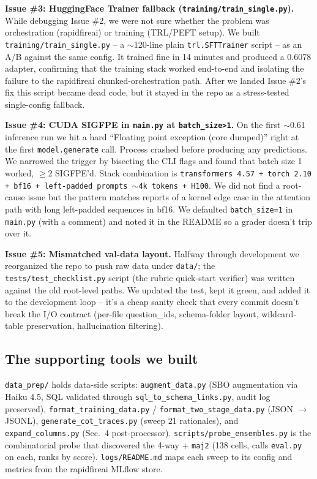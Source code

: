 \documentclass[10pt]{article}
\begin{document}
\textbf{Issue \#3: HuggingFace Trainer fallback (\texttt{training/train\_single.py}).}
While debugging Issue \#2, we were not sure whether the problem was orchestration
(rapidfireai) or training (TRL/PEFT setup). We built
\texttt{training/train\_single.py} -- a $\sim$120-line plain
\texttt{trl.SFTTrainer} script -- as an A/B against the same config. It
trained fine in 14 minutes and produced a 0.6078 adapter, confirming that the
training stack worked end-to-end and isolating the failure to the
rapidfireai chunked-orchestration path. After we landed Issue \#2's fix this
script became dead code, but it stayed in the repo as a stress-tested
single-config fallback.

\textbf{Issue \#4: CUDA SIGFPE in \texttt{main.py} at \texttt{batch\_size>1}.}
On the first $\sim$0.61 inference run we hit a hard ``Floating point exception
(core dumped)'' right at the first \texttt{model.generate} call. Process
crashed before producing any predictions. We narrowed the trigger by bisecting
the CLI flags and found that batch size 1 worked, $\geq$2 SIGFPE'd. Stack
combination is \texttt{transformers 4.57 + torch 2.10 + bf16 + left-padded
prompts $\sim$4k tokens + H100}. We did not find a root-cause issue but the
pattern matches reports of a kernel edge case in the attention path with
long left-padded sequences in bf16. We defaulted
\texttt{batch\_size=1} in \texttt{main.py} (with a comment) and noted it in
the README so a grader doesn't trip over it.

\textbf{Issue \#5: Mismatched val-data layout.} Halfway through development we
reorganized the repo to push raw data under \texttt{data/}; the
\texttt{tests/test\_checklist.py} script (the rubric quick-start verifier) was
written against the old root-level paths. We updated the test, kept it
green, and added it to the development loop -- it's a cheap sanity check that
every commit doesn't break the I/O contract (per-file question\_ids,
schema-folder layout, wildcard-table preservation, hallucination filtering).

\subsection{The supporting tools we built}
\texttt{data\_prep/} holds data-side scripts: \texttt{augment\_data.py}
(SBO augmentation via Haiku 4.5, SQL validated through
\texttt{sql\_to\_schema\_links.py}, audit log preserved),
\texttt{format\_training\_data.py} / \texttt{format\_two\_stage\_data.py}
(JSON $\rightarrow$ JSONL), \texttt{generate\_cot\_traces.py} (sweep 21
rationales), and \texttt{expand\_columns.py} (Sec.~4 post-processor).
\texttt{scripts/probe\_ensembles.py} is the combinatorial probe that
discovered the 4-way + \texttt{maj2} (138 cells, calls \texttt{eval.py}
on each, ranks by score). \texttt{logs/README.md} maps each sweep to
its config and metrics from the rapidfireai MLflow store.
\end{document}
